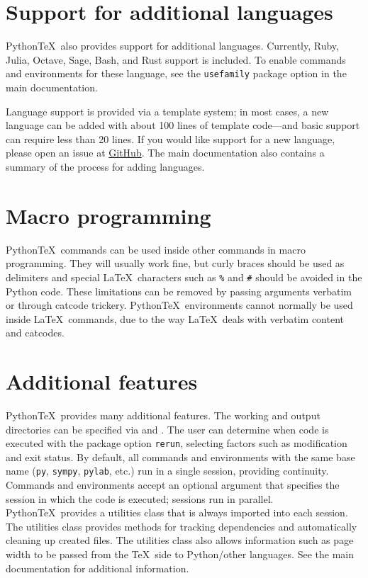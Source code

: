 \documentclass[twocolumn]{article}
\newcommand{\pytex}{Python\TeX}
\begin{document}
{\section*{Support for additional languages}

\pytex\ also provides support for additional languages.  Currently, Ruby, Julia, Octave, Sage, Bash, and Rust support is included.  To enable commands and environments for these language, see the \texttt{usefamily} package option in the main documentation.

Language support is provided via a template system; in most cases, a new language can be added with about 100 lines of template code---and basic support can require less than 20 lines.  If you would like support for a new language, please open an issue at \href{https://github.com/gpoore/pythontex}{GitHub}.  The main documentation also contains a summary of the process for adding languages.

\section*{Macro programming}

\pytex\ commands can be used inside other commands in macro programming.  They will usually work fine, but curly braces should be used as delimiters and special \LaTeX\ characters such as \texttt{\%} and \texttt{\#} should be avoided in the Python code.  These limitations can be removed by passing arguments verbatim or through catcode trickery.  \pytex\ environments cannot normally be used inside \LaTeX\ commands, due to the way \LaTeX\ deals with verbatim content and catcodes.


\section*{Additional features}

\pytex\ provides many additional features.  The working and output directories can be specified via  and .  The user can determine when code is executed with the package option \texttt{rerun}, selecting factors such as modification and exit status.  By default, all commands and environments with the same base name (\texttt{py}, \texttt{sympy}, \texttt{pylab}, etc.) run in a single session, providing continuity.  Commands and environments accept an optional argument that specifies the session in which the code is executed; sessions run in parallel.  \pytex\ provides a utilities class that is always imported into each session.  The utilities class provides methods for tracking dependencies and automatically cleaning up created files.  The utilities class also allows information such as page width to be passed from the \TeX\ side to Python/other languages.  See the main documentation for additional information.

}
\end{document}

